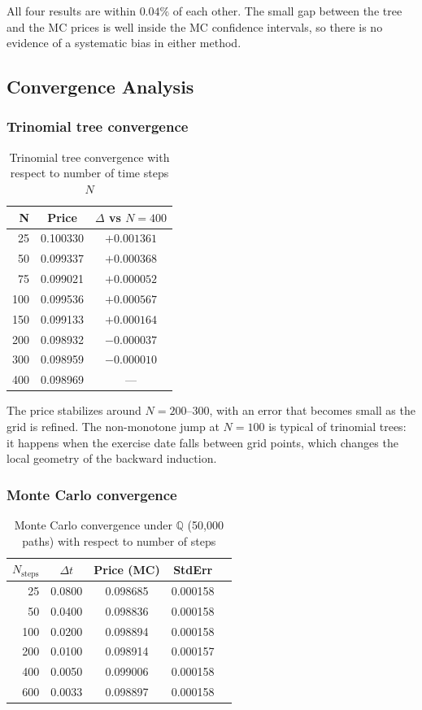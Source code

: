 \documentclass[12pt, a4paper]{article}
\newcommand{\Q}{\mathbb{Q}}
\begin{document}
All four results are within $0.04\%$ of each other. The small gap between the tree and the MC prices is well inside the MC confidence intervals, so there is no evidence of a systematic bias in either method.

\subsection{Convergence Analysis}

\subsubsection{Trinomial tree convergence}

\begin{table}[H]
\centering
\begin{tabular}{rcc}
\toprule
\textbf{N} & \textbf{Price} & \textbf{$\Delta$ vs $N=400$} \\
\midrule
25  & 0.100330 & $+0.001361$ \\
50  & 0.099337 & $+0.000368$ \\
75  & 0.099021 & $+0.000052$ \\
100 & 0.099536 & $+0.000567$ \\
150 & 0.099133 & $+0.000164$ \\
200 & 0.098932 & $-0.000037$ \\
300 & 0.098959 & $-0.000010$ \\
400 & 0.098969 & ---          \\
\bottomrule
\end{tabular}
\caption{Trinomial tree convergence with respect to number of time steps $N$}
\end{table}

The price stabilizes around $N=200$--$300$, with an error that becomes small as the grid is refined. The non-monotone jump at $N=100$ is typical of trinomial trees: it happens when the exercise date falls between grid points, which changes the local geometry of the backward induction.

\subsubsection{Monte Carlo convergence}

\begin{table}[H]
\centering
\begin{tabular}{rcccc}
\toprule
\textbf{$N_{\text{steps}}$} & \textbf{$\Delta t$} & \textbf{Price (MC)} & \textbf{StdErr} \\
\midrule
 25  & 0.0800 & 0.098685 & 0.000158 \\
 50  & 0.0400 & 0.098836 & 0.000158 \\
100  & 0.0200 & 0.098894 & 0.000158 \\
200  & 0.0100 & 0.098914 & 0.000157 \\
400  & 0.0050 & 0.099006 & 0.000158 \\
600  & 0.0033 & 0.098897 & 0.000158 \\
\bottomrule
\end{tabular}
\caption{Monte Carlo convergence under $\Q$ (50,000 paths) with respect to number of steps}
\end{table}
\end{document}

